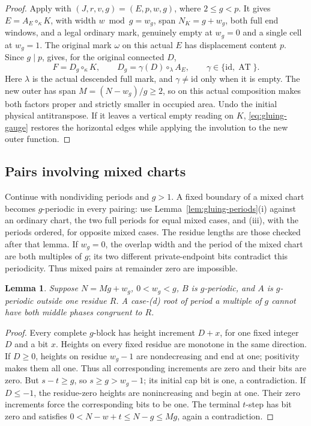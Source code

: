 \documentclass[11pt,a4paper]{amsart}
\numberwithin{equation}{section}
\theoremstyle{plain}
\newtheorem{lemma}[theorem]{Lemma}
\theoremstyle{definition}
\begin{document}
\begin{proof}
Apply  with
\((J,r,v,g)=(E,p,w,g)\), where \(2\le g<p\).
It gives \(E=A_E\circ_\kappa K\), with width
\(w\bmod g=w_g\), span \(N_K=g+w_g\), both full end windows,
and a legal ordinary mark, genuinely empty at \(w_g=0\) and a
single cell at \(w_g=1\).  The original mark \(\omega\) on this
actual \(E\) has displacement content \(p\).  Since \(g\mid p\),
 gives, for the original connected \(D\),
\[
 F=D_g\circ_\kappa K,\qquad
 D_g=\gamma(D)\circ_\lambda A_E,\qquad
 \gamma\in\{\mathrm{id},\operatorname{AT}\}.
\]
Here \(\lambda\) is the actual descended full mark, and
\(\gamma\ne\mathrm{id}\) only when it is empty.  The new outer has
span \(M=(N-w_g)/g\ge2\), so  on this actual
composition makes both factors proper and strictly smaller in
occupied area.  Undo the initial physical antitranspose.
If it leaves a vertical empty reading on \(K\),
\eqref{eq:gluing-gauge} restores the horizontal edges while applying
the involution to the new outer function.

\end{proof}

\subsection{Pairs involving mixed charts}

Continue with nondividing periods and \(g>1\).  A fixed boundary of a mixed chart becomes \(g\)-periodic in every pairing: use Lemma~\ref{lem:gluing-periods}(i) against an ordinary chart, the two full periods for equal mixed cases, and (iii), with the periods ordered, for opposite mixed cases.  The residue lengths are those checked after that lemma.  If \(w_g=0\), the overlap width and the period of the mixed chart are both multiples of \(g\); its two different private-endpoint bits contradict this periodicity.  Thus mixed pairs at remainder zero are impossible.

\begin{lemma}\label{lem:gluing-collision}
Suppose \(N=Mg+w_g\), \(0<w_g<g\), \(B\) is \(g\)-periodic, and \(A\) is \(g\)-periodic outside one residue \(R\).  A case-(d) root of period a multiple of \(g\) cannot have both middle phases congruent to \(R\).
\end{lemma}
\begin{proof}
Every complete \(g\)-block has height increment \(D+x\), for one fixed integer \(D\) and a bit \(x\).  Heights on every fixed residue are monotone in the same direction.  If \(D\ge0\), heights on residue \(w_g-1\) are nondecreasing and end at one; positivity makes them all one.  Thus all corresponding increments are zero and their bits are zero.  But \(s-t\ge g\), so \(s\ge g>w_g-1\); its initial cap bit is one, a contradiction.  If \(D\le-1\), the residue-zero heights are nonincreasing and begin at one.  Their zero increments force the corresponding bits to be one.  The terminal \(t\)-step has bit zero and satisfies
\(0<N-w+t\le N-g\le Mg\), again a contradiction.
\end{proof}
\end{document}
